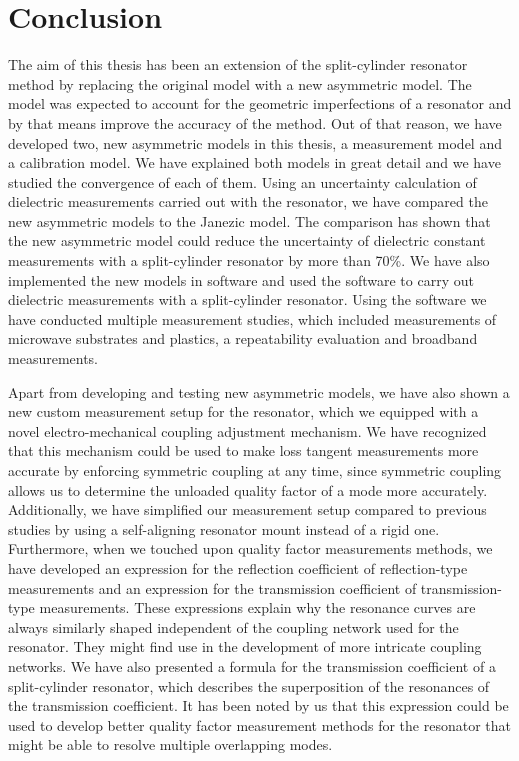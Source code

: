 \chapter{Conclusion}
The aim of this thesis has been an extension of the split-cylinder resonator method by replacing the original model with a new asymmetric model. The model was expected to account for the geometric imperfections of a resonator and by that means improve the accuracy of the method. Out of that reason, we have developed two, new asymmetric models in this thesis, a measurement model and a calibration model. We have explained both models in great detail   and we have studied the convergence of each of them. Using an uncertainty calculation of dielectric measurements carried out with the resonator, we have compared the new asymmetric models to the Janezic model. The comparison has shown that the new asymmetric model could reduce the uncertainty of dielectric constant measurements with a split-cylinder resonator by more than 70\%. We have also implemented the new models in software and used the software to carry out dielectric measurements with a split-cylinder resonator. Using the software we have conducted multiple measurement studies, which included measurements of microwave substrates and plastics, a repeatability evaluation and broadband measurements.

Apart from developing and testing new asymmetric models, we have also shown a new custom measurement setup for the resonator, which we equipped with a novel electro-mechanical coupling adjustment mechanism. We have recognized that this mechanism could be used to make loss tangent measurements more accurate by enforcing symmetric coupling at any time, since symmetric coupling allows us to determine the unloaded quality factor of a mode more accurately. Additionally, we have simplified our measurement setup compared to previous studies by using a self-aligning resonator mount instead of a rigid one. Furthermore, when we touched upon quality factor measurements methods, we have developed an expression for the reflection coefficient of reflection-type measurements and an expression for the transmission coefficient of transmission-type measurements. These expressions explain why the resonance curves are always similarly shaped independent of the coupling network used for the resonator. They might find use in the development of more intricate coupling networks. We have also presented a formula for the transmission coefficient of a split-cylinder resonator, which describes the superposition of the resonances of the transmission coefficient. It has been noted by us that this expression could be used to develop better quality factor measurement methods for the resonator that might be able to resolve multiple overlapping modes.

